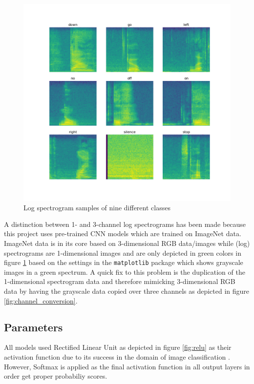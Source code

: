 \documentclass{article}
\theoremstyle{definition}
\theoremstyle{remark}
\begin{document}
\begin{figure}[h!]
    \centering
    \includegraphics[width=1\textwidth]{img/9_log_spectrograms.png}
    \caption{Log spectrogram samples of nine different classes}
    \label{fig:log_spectrograms}
\end{figure}

A distinction between 1- and 3-channel log spectrograms has been made because this project uses pre-trained CNN models which are trained on ImageNet data. ImageNet data is in its core based on 3-dimensional RGB data/images while (log) spectrograms are 1-dimensional images and are only depicted in green colors in figure \ref{fig:log_spectrograms} based on the settings in the \texttt{matplotlib} package which shows grayscale images in a green spectrum. A quick fix to this problem is the duplication of the 1-dimensional spectrogram data and therefore mimicking 3-dimensional RGB data by having the grayscale data copied over three channels as depicted in figure \ref{fig:channel_conversion}.

\newpage

\subsection{Parameters}


All models used Rectified Linear Unit as depicted in figure \ref{fig:relu} as their activation function due to its success in the domain of image classification \cite{dahl2013improving}. However, Softmax is applied as the final activation function in all output layers in order get proper probabiliy scores.
\end{document}
